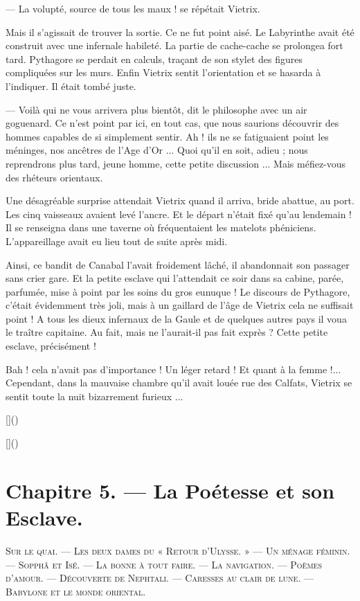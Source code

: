 \documentclass[a4paper, 11pt, oneside, polutonikogreek, french]{article}
\begin{document}
--- La volupté, source de tous les maux ! se répétait Vietrix.

Mais il s'agissait de trouver la sortie. Ce ne fut point aisé. Le Labyrinthe avait été construit avec une infernale habileté. La partie de cache-cache se prolongea fort tard. Pythagore se perdait en calculs, traçant de son stylet des figures compliquées sur les murs. Enfin Vietrix sentit l'orientation et se hasarda à l'indiquer. Il était tombé juste.

--- Voilà qui ne vous arrivera plus bientôt, dit le philosophe avec un air goguenard. Ce n'est point par ici, en tout cas, que nous saurions découvrir des hommes capables de si simplement sentir. Ah ! ils ne se fatiguaient point les méninges, nos ancêtres de l'Age d'Or ... Quoi qu'il en soit, adieu ; nous reprendrons plus tard, jeune homme, cette petite discussion ... Mais méfiez-vous des rhéteurs orientaux.

\bigskip
\centerline{\EightStarTaper}
\centerline{\EightStarTaper\EightStarTaper}
\bigskip

Une désagréable surprise attendait Vietrix quand il arriva, bride abattue, au port. Les cinq vaisseaux avaient levé l'ancre. Et le départ n'était fixé qu'au lendemain ! Il se renseigna dans une taverne où fréquentaient les matelots phéniciens. L'appareillage avait eu lieu tout de suite après midi.

Ainsi, ce bandit de Canabal l'avait froidement lâché, il abandonnait son passager sans crier gare. Et la petite esclave qui l'attendait ce soir dans sa cabine, parée, parfumée, mise à point par les soins du gros eunuque ! Le discours de Pythagore, c'était évidemment très joli, mais à un gaillard de l'âge de Vietrix cela ne suffisait point ! A tous les dieux infernaux de la Gaule et de quelques autres pays il voua le traître capitaine. Au fait, mais ne l'aurait-il pas fait exprès ? Cette petite esclave, précisément !

Bah ! cela n'avait pas d'importance ! Un léger retard ! Et quant à la femme !... Cependant, dans la mauvaise chambre qu'il avait louée rue des Calfats, Vietrix se sentit toute la nuit bizarrement furieux ...

[]()

[]()
\clearpage
\section{Chapitre 5. --- La Poétesse et son Esclave.}
\begin{center}
\scshape
\small
Sur le quai. --- Les deux dames du « Retour d'Ulysse. » --- Un ménage féminin. --- Sopphâ et Isé. --- La bonne à tout faire. --- La navigation. --- Poèmes d'amour. --- Découverte de Nephtali. --- Caresses au clair de lune. --- Babylone et le monde oriental.
\end{center}
\end{document}
